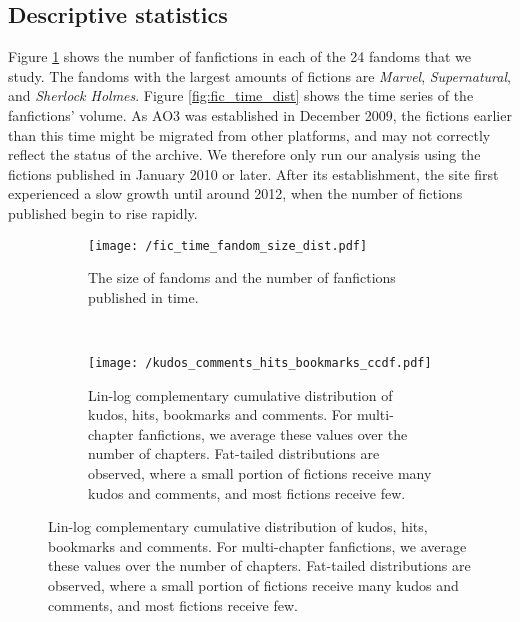 \documentclass[a4paper]{article}
\begin{document}
\subsection*{Descriptive statistics}

Figure \ref{fig:fandom_size} shows the number of fanfictions in each of the 24 fandoms that we study. The fandoms with the largest amounts of fictions are \emph{Marvel}, \emph{Supernatural}, and \emph{Sherlock Holmes}. Figure \ref{fig:fic_time_dist}  shows the time series of the fanfictions' volume. As AO3 was established in December 2009, the fictions earlier than this time might be migrated from other platforms, and may not correctly reflect the status of the archive. We therefore only run our analysis using the fictions published in January 2010 or later. After its establishment, the site first experienced a slow growth until around 2012, when the number of fictions published begin to rise rapidly. 

\begin{figure}
    \centering
    \begin{subfigure}[b]{\textwidth}
        \texttt{[image: /fic\_time\_fandom\_size\_dist.pdf]}
        \caption{The size of fandoms and the number of fanfictions published in time.}
        \label{fig:fandom_size}
    \end{subfigure}
    ~ %
    \begin{subfigure}[b]{\textwidth}
            \texttt{[image: /kudos\_comments\_hits\_bookmarks\_ccdf.pdf]}
        \caption{Lin-log complementary cumulative distribution of kudos, hits, bookmarks and comments. For multi-chapter fanfictions, we average these values over the number of chapters. Fat-tailed distributions are observed, where a small portion of fictions receive many kudos and comments, and most fictions receive few.}
        \label{fig:kudos_dist}
    \end{subfigure}

\end{figure}
\end{document}
